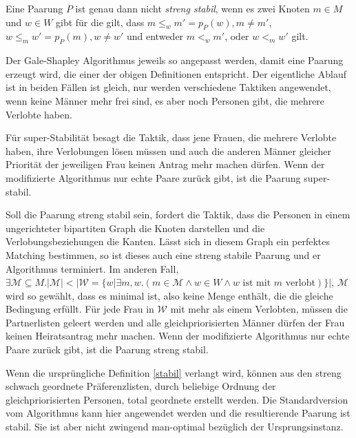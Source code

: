 \begin{Definition}
\label{streng_stabil}
  Eine Paarung $P$ ist genau dann nicht \textit{streng stabil}, wenn es zwei Knoten $m \in M$ und $w \in W$ gibt für die gilt, dass $m \leq_{w} m' = p_{P}(w), m \neq m'$, $w \leq_{m} w' = p_{P}(m), w \neq w'$ und entweder $m <_{w} m'$, oder $w <_{m} w'$ gilt.
\end{Definition}

Der Gale-Shapley Algorithmus jeweils so angepasst werden, damit eine Paarung erzeugt wird, die einer der obigen Definitionen entspricht. Der eigentliche Ablauf ist in beiden Fällen ist gleich, nur werden verschiedene Taktiken angewendet, wenn keine Männer mehr frei sind, es aber noch Personen gibt, die mehrere Verlobte haben.



Für super-Stabilität besagt die Taktik, dass jene Frauen, die mehrere Verlobte haben, ihre Verlobungen lösen müssen und auch die anderen Männer gleicher Priorität der jeweiligen Frau keinen Antrag mehr machen dürfen. Wenn der modifizierte Algorithmus nur echte Paare zurück gibt, ist die Paarung super-stabil.\par
Soll die Paarung streng stabil sein, fordert die Taktik, dass die Personen in einem ungerichteter bipartiten Graph die Knoten darstellen und die Verlobungsbeziehungen die Kanten. Lässt sich in diesem Graph ein perfektes Matching bestimmen, so ist dieses auch eine streng stabile Paarung und er Algorithmus terminiert. Im anderen Fall, $\exists \mathcal{M} \subseteq M. |\mathcal{M}| < |\mathcal{W} = \{w | \exists m, w.(m \in \mathcal{M} \land w \in W \land  w \textrm{ ist mit } m \textrm{ verlobt})\}|$, $\mathcal{M}$ wird so gewählt, dass es minimal ist, also keine Menge enthält, die die gleiche Bedingung erfüllt. Für jede Frau in $\mathcal{W}$ mit mehr als einem Verlobten, müssen die Partnerlisten geleert werden und alle gleichpriorisierten Männer dürfen der Frau keinen Heiratsantrag mehr machen.
Wenn der modifizierte Algorithmus nur echte Paare zurück gibt, ist die Paarung streng stabil.\par
Wenn die ursprüngliche Definition \ref{stabil} verlangt wird, können aus den streng schwach geordnete Präferenzlisten, durch beliebige Ordnung der gleichpriorisierten Personen, total geordnete erstellt werden. Die Standardversion vom Algorithmus kann hier angewendet werden und die resultierende Paarung ist stabil. Sie ist aber nicht zwingend man-optimal bezüglich der Ursprungsinstanz.
